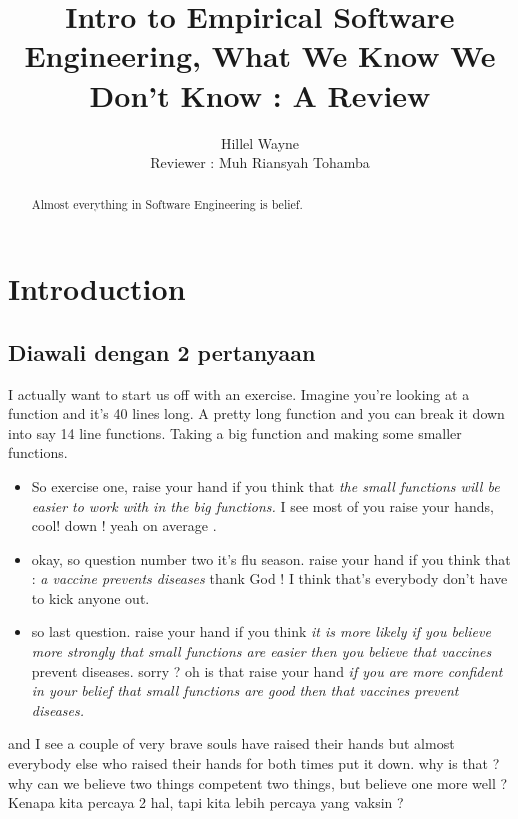 \documentclass[14pt]{extreport}
\begin{document}
\preto\tabular{\setcounter{magicrownumbers}{0}}
\newcommand\rownumber{\stepcounter{magicrownumbers}\arabic{magicrownumbers}}
\title{\Huge Intro to Empirical Software Engineering, What We Know We Don't Know : A Review}
\author{Hillel Wayne\\[1cm]{Reviewer : Muh Riansyah Tohamba}}

\maketitle
\begin{abstract}
Almost everything in Software Engineering is belief.
\end{abstract}

\chapter{Introduction}
\section{Diawali dengan 2 pertanyaan}
I actually want to start us off with an exercise. 
Imagine you're looking at a function and it's 40 lines long.
A pretty long function and you can break it down into say 14 line functions.
Taking a big function and making some smaller functions. 
\begin{itemize}
	\item So exercise one, raise your hand if you think that \textit{the small functions will be easier to work with in the big functions.}  I see most of you raise your hands, cool! down ! yeah on average .
	\item okay, so question number two it's flu season. raise your hand if you think that : \textit{a vaccine prevents diseases}   thank God !  I think that's everybody don't have to kick anyone out.
	\item so last question. raise your hand if you think \textit{it is more likely if you believe more strongly that small functions are easier then you believe that vaccines} prevent diseases. sorry ? oh is that raise your hand \textit{if you are more confident in your belief that small functions are good then that vaccines prevent diseases.} 
\end{itemize}

and I see a couple of very brave souls have raised
their hands but almost everybody else
who raised their hands for both times
put it down. 
why is that ? 
why can we believe two things competent two things, but believe one more well ?
Kenapa kita percaya 2 hal, tapi kita lebih percaya yang vaksin ? 
\end{document}
